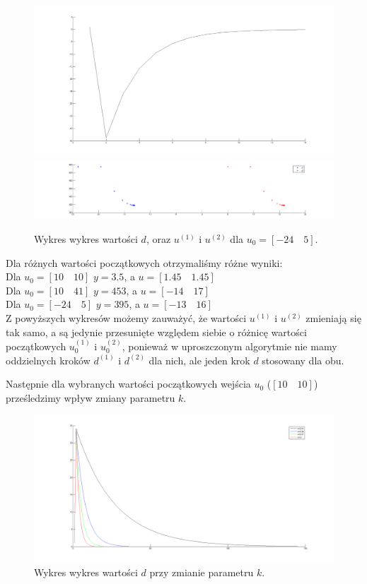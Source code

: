 \documentclass[a4paper,10pt]{article}
\begin{document}
\begin{figure}[!h]
    \centering
	\includegraphics[width=120mm]{CW4-alg1fun1-u-24_5-k01-d.png}
	\includegraphics[width=120mm]{CW4-alg1fun1-u-24_5-k01-u.png}
	\caption{Wykres wykres wartości $d$, oraz $u^{(1)}$ i $u^{(2)}$ dla $u_0=[-24 \quad 5]$.}
    \label{fig:Rysunek}
\end{figure}

\newpage Dla różnych wartości początkowych otrzymaliśmy różne wyniki:\\
Dla $u_{0}=[10 \quad 10]$ $y=3.5$, a $u=[1.45 \quad 1.45]$\\
Dla $u_{0}=[10 \quad 41]$ $y=453$, a $u=[-14 \quad 17]$\\
Dla $u_{0}=[-24 \quad 5]$ $y=395$, a $u=[-13 \quad 16]$\\

 Z powyższych wykresów możemy zauważyć, że wartości $u^{(1)}$ i $u^{(2)}$ zmieniają się tak samo, a są jedynie przesunięte względem siebie o różnicę wartości początkowych $u_0^{(1)}$ i $u_0^{(2)}$, ponieważ w uproszczonym algorytmie nie mamy oddzielnych kroków $d^{(1)}$ i $d^{(2)}$ dla nich, ale jeden krok $d$ stosowany dla obu.



Następnie dla wybranych wartości początkowych wejścia $u_0$ ($[10 \quad 10]$) prześledzimy wpływ zmiany parametru $k$.
\begin{figure}[!h]
    \centering
	\includegraphics[width=120mm]{CW4-alg1fun1-u10_10-k001_01-d.png}
	\caption{Wykres wykres wartości $d$ przy zmianie parametru $k$.}
    \label{fig:Rysunek}
\end{figure}
\end{document}
